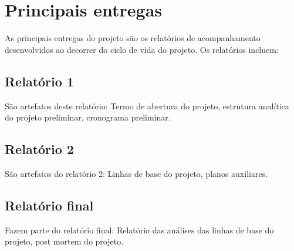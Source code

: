 \section{Principais entregas}

  As principais entregas do projeto são os relatórios
  de acompanhamento desenvolvidos ao decorrer do ciclo
  de vida do projeto. Os relatórios incluem:

  \subsection{Relatório 1}
    São artefatos deste relatório: Termo de abertura do
    projeto, estrutura analítica do projeto preliminar,
    cronograma preliminar.

  \subsection{Relatório 2}
    São artefatos do relatório 2: Linhas de base do projeto,
    planos auxiliares.

  \subsection{Relatório final}
    Fazem parte do relatório final: Relatório das análises
    das linhas de base do projeto, post mortem do projeto.
